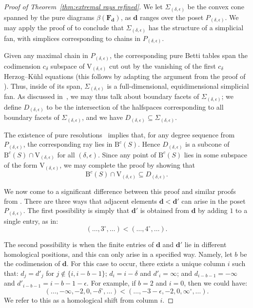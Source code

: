 \documentclass[12pt]{amsart}
\theoremstyle{definition}
\theoremstyle{remark}
\newcommand{\VV}{\mathrm{V}}
\newcommand{\cc}{c}
\newcommand{\dd}{\mathbf{d}}
\newcommand{\FF}{\mathbf{F}}
\newcommand{\defi}[1]{\textsf{#1}} %
\newcommand{\BBQ}{\mathrm{B}}
\begin{document}
\begin{proof}[Proof of Theorem~\ref{thm:extremal rays refined}]
We let $\Sigma_{(\delta,\epsilon)}$ be the convex cone spanned by the pure diagrams $\beta(\FF_{\dd})$, as $\dd$ ranges over the poset $P_{(\delta,\epsilon)}$.  We may apply the proof of  \cite[Proposition~2.9]{boij-sod1} to conclude that $\Sigma_{(\delta,\epsilon)}$ has the structure of a simplicial fan, with simplices corresponding to chains in $P_{(\delta,\epsilon)}$.

Given any maximal chain in $P_{(\delta,\epsilon)}$, the corresponding pure Betti tables span the codimension $c_{\delta}$ subspace of $\VV_{(\delta,\epsilon)}$ cut out by the vanishing of the first $c_{\delta}$ Herzog--K\"uhl equations (this follows by adapting the argument from the proof of \cite[Proposition~1]{boij-sod2}).  
Thus, inside of its span, $\Sigma_{(\delta,\epsilon)}$ is a full-dimensional, equidimensional simplicial fan.  
As discussed in~\cite[Appendix]{bbeg}, we may thus talk about boundary facets of $\Sigma_{(\delta,\epsilon)}$; we define $D_{(\delta,\epsilon)}$ to be the intersection of the halfspaces corresponding to all boundary facets of $\Sigma_{(\delta,\epsilon)}$, and we have $D_{(\delta,\epsilon)} \subseteq \Sigma_{(\delta,\epsilon)}$.

The existence of pure resolutions~\cite[Theorem~0.1]{eis-schrey1} implies that, for any degree sequence from $P_{(\delta,\epsilon)}$, the corresponding ray lies in $\BBQ^{\cc}(S)$.  Hence $D_{(\delta,\epsilon)}$ is a subcone of $\BBQ^{\cc}(S)\cap \VV_{(\delta,\epsilon)}$ for all $(\delta,\epsilon)$.  
Since any point of $\BBQ^{\cc}(S)$ lies in some subspace of the form $\VV_{(\delta,\epsilon)}$, we may complete the proof by showing that
\begin{equation}\label{eqn:inclusion}
\BBQ^{\cc}(S)\cap \VV_{(\delta,\epsilon)} \subseteq D_{(\delta,\epsilon)}.
\end{equation}

We now come to a significant difference between this proof and similar proofs from \cites{eis-schrey1,boij-sod2}.  There are three ways that  adjacent elements $\dd<\dd'$ can arise in the poset $P_{(\delta,\epsilon)}$.   The first possibility is simply that $\dd'$ is obtained from $\dd$ by adding $1$ to a single entry, as in:
\[
(\dots,3^\circ,\dots)<(\dots,4^\circ,\dots).
\]

The second possibility is when the finite entries of $\dd$ and $\dd'$ lie in different homological positions, and this can only arise in a specified way.  Namely, let $b$ be the codimension of $\dd$.  For this case to occur, there exists a unique column $i$ such that: $d_j=d'_j$ for $j\notin \{i, i-b-1\}$; $d_i=i-\delta$ and $d'_i=\infty$; and $d_{i-b-1}=-\infty$ and $d'_{i-b-1}=i-b-1-\epsilon$.  For example, if $b=2$ and $i=0$, then we could have:
\[
(\dots, -\infty, -2, 0, -\delta^\circ, \dots)<(\dots, -3-\epsilon,-2, 0, \infty^\circ, \dots).
\]
We refer to this as a \defi{homological shift from column $i$}.


\end{proof}
\end{document}

